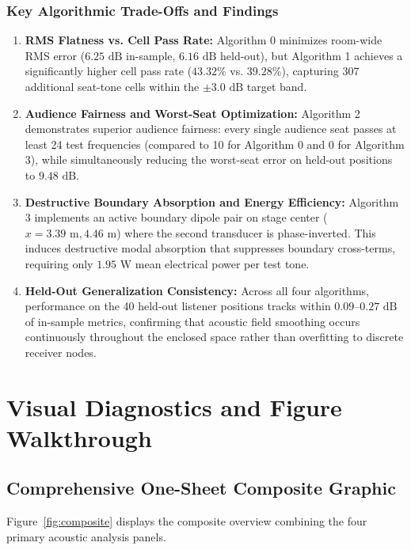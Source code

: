 \documentclass[11pt,a4paper]{article}
\begin{document}
\subsubsection{Key Algorithmic Trade-Offs and Findings}
\begin{enumerate}
    \item \textbf{RMS Flatness vs. Cell Pass Rate:} Algorithm 0 minimizes room-wide RMS error ($6.25\text{ dB}$ in-sample, $6.16\text{ dB}$ held-out), but Algorithm 1 achieves a significantly higher cell pass rate ($43.32\%$ vs. $39.28\%$), capturing 307 additional seat-tone cells within the $\pm 3.0\text{ dB}$ target band.
    \item \textbf{Audience Fairness and Worst-Seat Optimization:} Algorithm 2 demonstrates superior audience fairness: every single audience seat passes at least 24 test frequencies (compared to 10 for Algorithm 0 and 0 for Algorithm 3), while simultaneously reducing the worst-seat error on held-out positions to $9.48\text{ dB}$.
    \item \textbf{Destructive Boundary Absorption and Energy Efficiency:} Algorithm 3 implements an active boundary dipole pair on stage center ($x = 3.39\text{ m}, 4.46\text{ m}$) where the second transducer is phase-inverted. This induces destructive modal absorption that suppresses boundary cross-terms, requiring only $1.95\text{ W}$ mean electrical power per test tone.
    \item \textbf{Held-Out Generalization Consistency:} Across all four algorithms, performance on the 40 held-out listener positions tracks within $0.09\text{--}0.27\text{ dB}$ of in-sample metrics, confirming that acoustic field smoothing occurs continuously throughout the enclosed space rather than overfitting to discrete receiver nodes.
\end{enumerate}

\newpage

\section{Visual Diagnostics and Figure Walkthrough}

\subsection{Comprehensive One-Sheet Composite Graphic}

Figure~\ref{fig:composite} displays the composite overview combining the four primary acoustic analysis panels.
\end{document}
